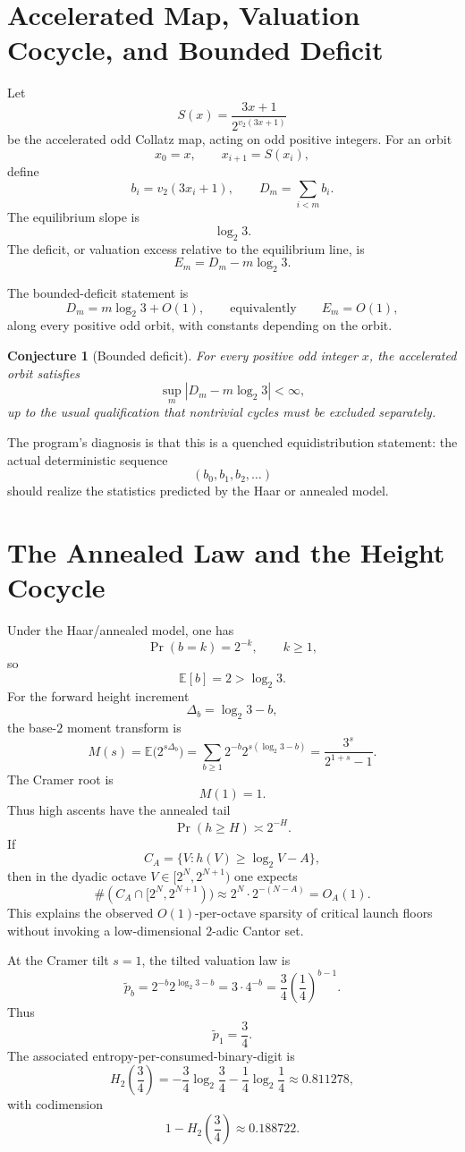 \documentclass[11pt]{article}
\newtheorem{conjecture}{Conjecture}
\begin{document}
\section{Accelerated Map, Valuation Cocycle, and Bounded Deficit}

Let
\[
S(x)=\frac{3x+1}{2^{v_2(3x+1)}}
\]
be the accelerated odd Collatz map, acting on odd positive integers.  For an orbit
\[
x_0=x,\qquad x_{i+1}=S(x_i),
\]
define
\[
b_i=v_2(3x_i+1),\qquad D_m=\sum_{i<m}b_i.
\]
The equilibrium slope is
\[
\log_2 3.
\]
The deficit, or valuation excess relative to the equilibrium line, is
\[
E_m=D_m-m\log_2 3.
\]

The bounded-deficit statement is
\[
D_m=m\log_2 3+O(1),
\qquad\text{equivalently}\qquad
E_m=O(1),
\]
along every positive odd orbit, with constants depending on the orbit.

\begin{conjecture}[Bounded deficit]
For every positive odd integer $x$, the accelerated orbit satisfies
\[
\sup_m |D_m-m\log_2 3|<\infty,
\]
up to the usual qualification that nontrivial cycles must be excluded separately.
\end{conjecture}

The program's diagnosis is that this is a quenched equidistribution statement: the actual deterministic sequence
\[
(b_0,b_1,b_2,\ldots)
\]
should realize the statistics predicted by the Haar or annealed model.

\section{The Annealed Law and the Height Cocycle}

Under the Haar/annealed model, one has
\[
\Pr(b=k)=2^{-k},\qquad k\ge 1,
\]
so
\[
\mathbb E[b]=2>\log_2 3.
\]
For the forward height increment
\[
\Delta_b=\log_2 3-b,
\]
the base-$2$ moment transform is
\[
M(s)=\mathbb E\bigl(2^{s\Delta_b}\bigr)
=\sum_{b\ge1}2^{-b}2^{s(\log_2 3-b)}
=\frac{3^s}{2^{1+s}-1}.
\]
The Cramer root is
\[
M(1)=1.
\]
Thus high ascents have the annealed tail
\[
\Pr(h\ge H)\asymp 2^{-H}.
\]
If
\[
C_A=\{V: h(V)\ge \log_2 V-A\},
\]
then in the dyadic octave $V\in[2^N,2^{N+1})$ one expects
\[
\#(C_A\cap[2^N,2^{N+1}))
\approx 2^N\cdot 2^{-(N-A)}=O_A(1).
\]
This explains the observed $O(1)$-per-octave sparsity of critical launch floors without invoking a low-dimensional $2$-adic Cantor set.

At the Cramer tilt $s=1$, the tilted valuation law is
\[
\widetilde p_b
=2^{-b}2^{\log_2 3-b}
=3\cdot 4^{-b}
=\frac34\left(\frac14\right)^{b-1}.
\]
Thus
\[
\widetilde p_1=\frac34.
\]
The associated entropy-per-consumed-binary-digit is
\[
H_2\!\left(\frac34\right)
=-\frac34\log_2\frac34-\frac14\log_2\frac14
\approx 0.811278,
\]
with codimension
\[
1-H_2\!\left(\frac34\right)\approx 0.188722.
\]
\end{document}
